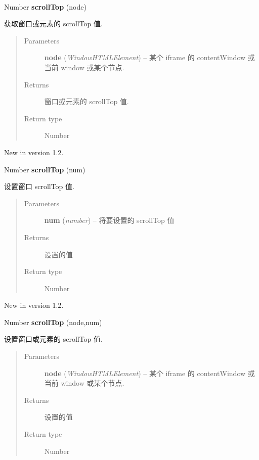 \documentclass[letterpaper,10pt,english]{sphinxmanual}
\begin{document}
\begin{fulllineitems}
\label{api/core/dom/scrollTop:DOM.scrollTop}~
\begin{DUlineblock}{0em}
\item[] Number \textbf{scrollTop} (node)
\item[] 获取窗口或元素的 scrollTop 值.
\end{DUlineblock}
\begin{quote}\begin{description}
\item[{Parameters}] \leavevmode
\textbf{node} (\emph{Window\textbar{}HTMLElement}) -- 某个 iframe 的 contentWindow 或当前 window 或某个节点.

\item[{Returns}] \leavevmode
窗口或元素的 scrollTop 值.

\item[{Return type}] \leavevmode
Number

\end{description}\end{quote}
New in version 1.2.
\begin{DUlineblock}{0em}
\item[] Number \textbf{scrollTop} (num)
\item[] 设置窗口 scrollTop 值.
\end{DUlineblock}
\begin{quote}\begin{description}
\item[{Parameters}] \leavevmode
\textbf{num} (\emph{number}) -- 将要设置的 scrollTop 值

\item[{Returns}] \leavevmode
设置的值

\item[{Return type}] \leavevmode
Number

\end{description}\end{quote}
New in version 1.2.
\begin{DUlineblock}{0em}
\item[] Number \textbf{scrollTop} (node,num)
\item[] 设置窗口或元素的 scrollTop 值.
\end{DUlineblock}
\begin{quote}\begin{description}
\item[{Parameters}] \leavevmode
\textbf{node} (\emph{Window\textbar{}HTMLElement}) -- 某个 iframe 的 contentWindow 或当前 window 或某个节点.

\item[{Returns}] \leavevmode
设置的值

\item[{Return type}] \leavevmode
Number

\end{description}\end{quote}

\end{fulllineitems}
\end{document}
